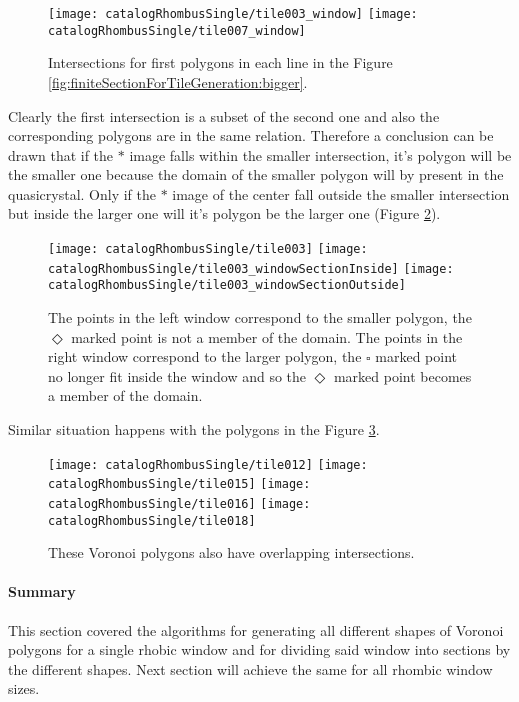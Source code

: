 \documentclass[text.tex]{subfiles}
\begin{document}
\begin{figure}[h]
\centering
\texttt{[image: catalogRhombusSingle/tile003\_window]}
\texttt{[image: catalogRhombusSingle/tile007\_window]}
\caption{Intersections for first polygons in each line in the Figure \ref{fig:finiteSectionForTileGeneration:bigger}.}
\label{fig:intersectionsComparison}
\end{figure}

Clearly the first intersection is a subset of the second one and also the corresponding polygons are in the same relation. Therefore a conclusion can be drawn that if the $\ast$ image falls within the smaller intersection, it's polygon will be the smaller one because the domain of the smaller polygon will by present in the quasicrystal. Only if the $\ast$ image of the center fall outside the smaller intersection but inside the larger one will it's polygon be the larger one (Figure \ref{fig:intersectionOverlap}).

\begin{figure}[h]
\centering
\texttt{[image: catalogRhombusSingle/tile003]}
\texttt{[image: catalogRhombusSingle/tile003\_windowSectionInside]}
\texttt{[image: catalogRhombusSingle/tile003\_windowSectionOutside]}
\caption{The points in the left window correspond to the smaller polygon, the {\scriptsize $\Diamond$} marked point is not a member of the domain. The points in the right window correspond to the larger polygon, the {\scriptsize $\square$} marked point no longer fit inside the window and so the {\scriptsize $\Diamond$} marked point becomes a member of the domain.}
\label{fig:intersectionOverlap}
\end{figure}

Similar situation happens with the polygons in the Figure \ref{fig:morePolygonsExample}.

\begin{figure}[h]
\centering
\texttt{[image: catalogRhombusSingle/tile012]}
\texttt{[image: catalogRhombusSingle/tile015]}
\texttt{[image: catalogRhombusSingle/tile016]}
\texttt{[image: catalogRhombusSingle/tile018]}
\caption{These Voronoi polygons also have overlapping intersections.}
\label{fig:morePolygonsExample}
\end{figure}

\paragraph{Summary}
This section covered the algorithms for generating all different shapes of Voronoi polygons for a single rhobic window and for dividing said window into sections by the different shapes. Next section will achieve the same for all rhombic window sizes.
\end{document}
